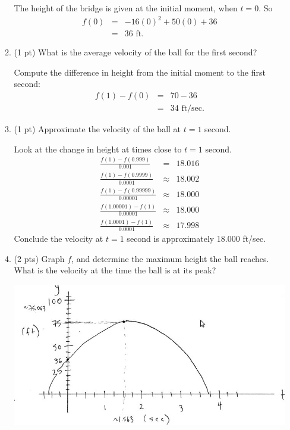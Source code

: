 \documentclass[11pt,letterpaper]{article}
\begin{document}
\begin{enumerate}
\begin{enumerate}
\vspace{.5pc}
The height of the bridge is given at the initial moment, when $t=0$.  So
\begin{eqnarray*}
 f(0) &=& -16(0)^2+50(0)+36 \\
&=& 36 \text{ ft.}
\end{eqnarray*}

\vspace{.5pc}
\item (1 pt) What is the average velocity of the ball for the first second?

\vspace{.5pc}
Compute the difference in height from the initial moment to the first second:
\begin{eqnarray*}
 f(1)-f(0) &=& 70-36 \\
&=& 34 \text{ ft/sec.}
\end{eqnarray*}

\vspace{.5pc}
\item (1 pt) Approximate the velocity of the ball at $t=1$ second.

\vspace{.5pc}
Look at the change in height at times close to $t=1$ second.
\begin{eqnarray*}
 \frac{f(1)-f(0.999)}{0.001} &=& 18.016 \\
 \frac{f(1)-f(0.9999)}{0.0001} &\approx & 18.002 \\
 \frac{f(1)-f(0.99999)}{0.00001} &\approx & 18.000 \\
 \frac{f(1.00001)-f(1)}{0.00001} &\approx & 18.000 \\
 \frac{f(1.0001)-f(1)}{0.0001} &\approx & 17.998 
\end{eqnarray*}
Conclude the velocity at $t=1$ second is approximately 18.000 ft/sec.

\vspace{.5pc}
\item (2 pts) Graph $f$, and determine the maximum height the ball reaches.  What is the velocity at the time the ball is at its peak?

\begin{center}
 \includegraphics[scale=.4]{./115f10quiz2pic.jpg}
\end{center}


\end{enumerate}
\end{enumerate}
\end{document}
